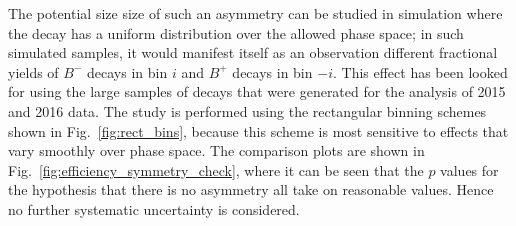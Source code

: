 The potential size size of such an asymmetry can be studied in simulation where the \D decay has a uniform distribution over the allowed phase space; in such simulated samples, it would manifest itself as an observation different fractional yields 
of $B^-$ decays in bin $i$ and $B^+$ decays in bin $-i$. This effect has been looked for using the large samples of \BtoDpi decays that were generated for the analysis of 2015 and 2016 data. The study is performed using the rectangular binning schemes shown in Fig.~\ref{fig:rect_bins}, because this scheme is most sensitive to effects that vary smoothly over phase space. The comparison plots are shown in Fig.~\ref{fig:efficiency_symmetry_check}, where it can be seen that the $p$ values for the hypothesis that there is no asymmetry all take on reasonable values. Hence no further systematic uncertainty is considered.

